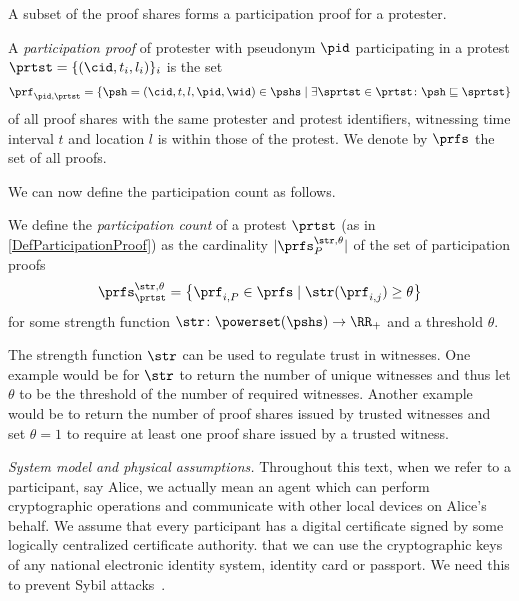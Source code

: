 A subset of the proof shares forms a participation proof for a protester.

\NewVariable{\prf}{\pi}
\NewVariable{\prfs}{\Pi}

\begin{definition}%
  \label{DefParticipationProof}
  A \emph{participation proof} of protester with pseudonym \(\pid\) 
  participating in a protest \(\prtst = \{ (\cid, t_i, l_i) \}_i\) is the set
  \begin{multline}
    \nonumber
    \prf_{\pid, \prtst} =
    \left\{ \psh = (\cid, t, l, \pid, \wid)\in \pshs \mid
      \exists \sprtst\in \prtst\colon \psh\sqsubseteq \sprtst \right\}
  \end{multline}
  of all proof shares with the same protester and protest identifiers, 
  witnessing time interval \(t\) and location \(l\) is within those of the 
  protest.
  We denote by \(\prfs\) the set of all proofs.
\end{definition}

\NewFunction{\str}{\varsigma}

We can now define the participation count as follows.
\begin{definition}
  We define the \emph{participation count} of a protest \(\prtst\) (as in 
  \cref{DefParticipationProof}) as the cardinality \(|\prfs_{P}^{\str,\theta}|\) 
  of the set of participation proofs \[
    \prfs_{\prtst}^{\str,\theta} = \left\{ \prf_{i,P} \in \prfs \mid
      \str(\prf_{i,j})\geq \theta \right\}
  \] for some strength function \(\str\colon \powerset(\pshs)\to \RR_+\) and a 
  threshold \(\theta\).
\end{definition}
The strength function \(\str\) can be used to regulate trust in witnesses.
One example would be for \(\str\) to return the number of unique witnesses and 
thus let \(\theta\) to be the threshold of the number of required witnesses.
Another example would be to return the number of proof shares issued by trusted 
witnesses and set \(\theta = 1\) to require at least one proof share issued by a 
trusted witness.

\emph{System model and physical assumptions.}\label{assumptions}
Throughout this text, when we refer to a participant, say Alice, we actually 
mean an agent which can perform cryptographic operations and communicate with 
other local devices on Alice's behalf. We assume that every participant has a digital certificate signed by 
some logically centralized certificate authority.
\Eg that we can use the cryptographic keys of any national electronic identity 
system, identity card or passport.
We need this to prevent Sybil attacks~\cite{SybilAttack}.

